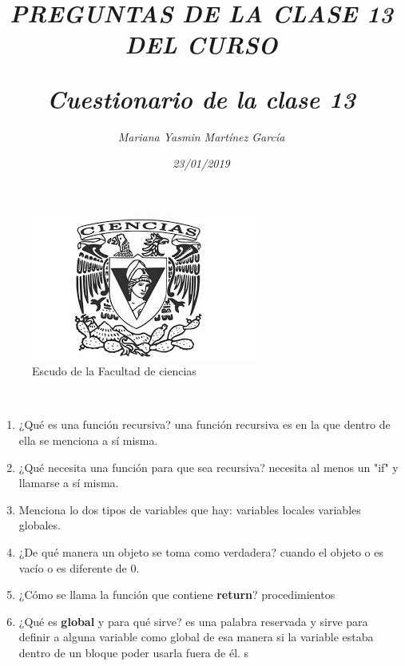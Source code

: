 \documentclass{article}
\title{\Huge\item\color{magenta}\textit{PREGUNTAS DE LA CLASE 13 DEL CURSO}}
\author{\Large\textit{Mariana Yasmin Martínez García}}
\date{\Large\textit{23/01/2019}}
\begin{document}
\begin{figure}[t]
	\centering
	\includegraphics[width=0.7\linewidth]{Imagenes/1}
	\caption{Escudo de la Facultad de ciencias}
	\label{figura:1}
\end{figure}

	\maketitle
		
	\newpage
	
	\title{\huge\color{magenta}\textbf{\textit{Cuestionario de la clase 13}}} \\
	\begin{enumerate}
		 \item{\Large\color{purple} ¿Qué es una función recursiva?} una función recursiva es en la que dentro de ella se menciona a sí misma.
		 \item{\Large\color{purple} ¿Qué necesita una función para que sea recursiva?} necesita al menos un "if" y llamarse a sí misma.
		 \item{\Large\color{purple} Menciona lo dos tipos de variables que hay: } variables locales  variables globales.
		 \item{\Large\color{purple} ¿De qué manera un objeto se toma como verdadera?} cuando el objeto o es vacío o es diferente de 0.
		 \item{\Large\color{purple} ¿Cómo se llama la función que contiene \textbf{return}?} procedimientos
		 \item{\Large\color{purple} ¿Qué es \textbf{global} y para qué sirve?} es una palabra reservada y sirve para definir a alguna variable como global  de esa manera si la variable estaba dentro de un bloque poder usarla fuera de él. s
	\end{enumerate}
	
\end{document}
